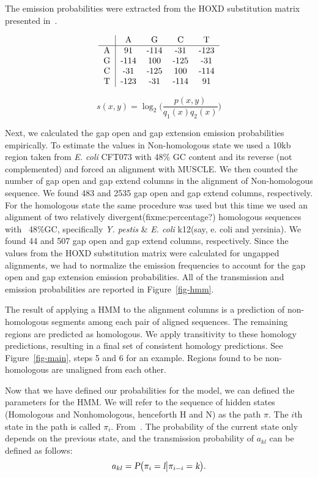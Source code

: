 \documentclass{ws-procs9x6}
\begin{document}
The emission probabilities were extracted from the HOXD substitution matrix presented in~\cite{hoxd}.

\begin{equation}
\begin{tabular}
{c|cccc}
& A & G & C & T \\
\hline
 A   & 91 & -114 &-31 & -123 \\
 G   & -114 & 100 &-125 & -31 \\
 C   & -31 & -125 &100 & -114\\
 T   & -123 & -31 &-114 & 91 \\
\end{tabular}
\end{equation}

\begin{equation}
s(x,y)= \log_{2}{\Bigg(\frac{p(x,y)}{q_{1}(x)q_{2}(x)}\Bigg)}
\end{equation}

Next, we calculated the gap open and gap extension emission probabilities empirically. To estimate the values in Non-homologous state we used a 10kb region taken from \emph{E. coli} CFT073 with 48\% GC content and its reverse (not complemented) and forced an alignment with MUSCLE.  We then counted the number of gap open and gap extend columns in the alignment of Non-homologous sequence. We found 483 and 2535 gap open and  gap extend columns, respectively.  For the homologous state the same procedure was used but this time we used an alignment of two relatively divergent(fixme:percentage?) homologous sequences with ~48\%GC, specifically \emph{Y. pestis} \& \emph{E. coli} k12(say, e. coli and yersinia). We found 44 and 507 gap open and  gap extend columns, respectively.  Since the values from the HOXD substitution matrix were calculated for ungapped alignments, we had to normalize the emission frequencies to account for the gap open and gap extension emission probabilities. All of the transmission and emission probabilities are reported in Figure~\ref{fig-hmm}.

The result of applying a HMM to the alignment columns is a prediction of non-homologous segments among each pair of aligned sequences.  The remaining regions are predicted as homologous.  We apply transitivity to these homology predictions, resulting in a final set of consistent homology predictions.  See Figure~\ref{fig-main}, steps 5 and 6 for an example. Regions found to be non-homologous are unaligned from each other.

Now that we have defined our probabilities for the model, we can defined the parameters for the HMM. We will refer to the sequence of hidden states (Homologous and Nonhomologous, henceforth H and N) as the path $\pi$. The $i$th state in the path is called $\pi_{i}$. From~\cite{durbin}. The probability of the current state only depends on the previous state, and the transmission probability of $a_{kl}$ can be defined as follows:
\begin{equation}
a_{kl} = \textsl{P}\big(\pi_{i}=\textsl{l}\big|\pi_{i-i}=\textsl{k}\big).
\end{equation}
\end{document}

